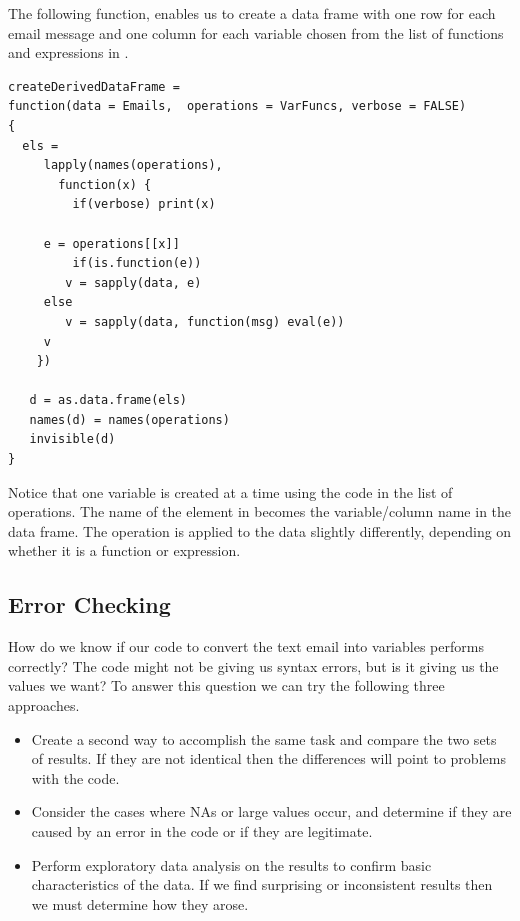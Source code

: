 The following function, 
enables us to create a data frame with one row for each email 
message and one column for each variable chosen from the list 
of functions and expressions in .

{\footnotesize{
\begin{verbatim}
createDerivedDataFrame =
function(data = Emails,  operations = VarFuncs, verbose = FALSE)
{
  els =
     lapply(names(operations),
       function(x) {
         if(verbose) print(x)

	 e = operations[[x]]
         if(is.function(e))
	    v = sapply(data, e)
	 else
	    v = sapply(data, function(msg) eval(e))
	 v
	})

   d = as.data.frame(els)
   names(d) = names(operations)
   invisible(d)
}
\end{verbatim}
}}

Notice that one variable is created at a time using the code
in the list of operations.  The name of the element in 
becomes the variable/column name in the data frame. 
The operation is applied to the data slightly differently, 
depending on whether it is a function or expression.


\subsection{Error Checking}
How do we know if our code to convert the text email into
variables performs correctly?
The code might not be giving us syntax errors, but
is it giving us the values we want?
To answer this question we can try the following 
three approaches.

\begin{itemize}
\item
Create a second way to accomplish the same task and compare the 
two sets of results. If they are not identical then the differences
will point to problems with the code.

\item Consider the cases where NAs or large values occur, 
and determine if they are caused by an error in the code or 
if they are legitimate.

\item Perform exploratory data analysis on the results to confirm
basic characteristics of the data. If we find surprising or
inconsistent results then we must determine how they arose. 
\end{itemize}

